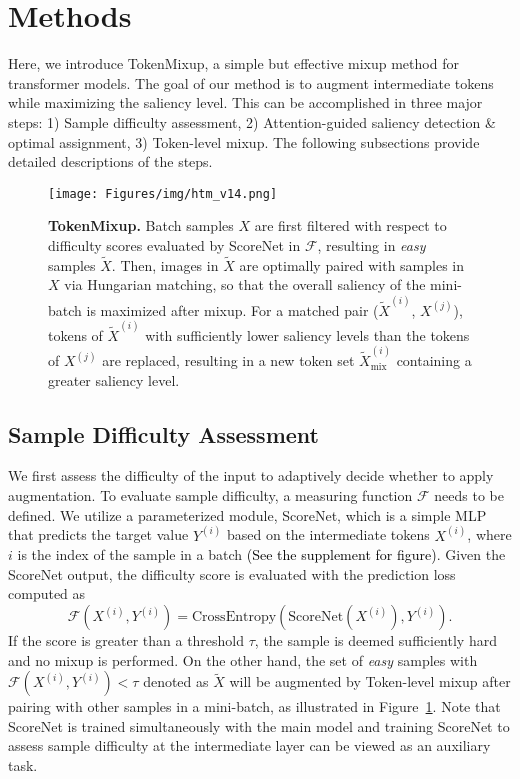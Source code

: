 \documentclass{article}
\begin{document}
 \section{Methods}
\label{section:method}
Here, we introduce TokenMixup, a simple but effective mixup method for transformer models.
The goal of our method is to augment intermediate tokens while maximizing the saliency level.
This can be accomplished in three major steps: 1) Sample difficulty assessment, 2) Attention-guided saliency detection \& optimal assignment, 3) Token-level mixup.
The following subsections provide detailed descriptions of the steps.


\begin{figure}[t]
\begin{center}
\texttt{[image: Figures/img/htm\_v14.png]}
\end{center}
\vspace{-4mm}
\caption{\footnotesize \textbf{TokenMixup.} Batch samples $X$ are first filtered with respect to difficulty scores evaluated by ScoreNet in $\mathcal{F}$, resulting in \textit{easy} samples $\tilde{X}$. 
Then, images in $\tilde{X}$ are optimally paired with samples in $X$ via Hungarian matching, so that the overall saliency of the mini-batch is maximized after mixup. 
For a matched pair ($\tilde{X}^{(i)}$, $X^{(j)}$), tokens of $\tilde{X}^{(i)}$ with sufficiently lower saliency levels than the tokens of $X^{(j)}$ are replaced, resulting in a new token set $\tilde{X}^{(i)}_{\textrm{mix}}$ containing a greater saliency level.}
\label{fig:htm}
\end{figure} 
\subsection{Sample Difficulty Assessment}
\label{sec:scorenet}
We first assess the difficulty of the input to adaptively decide whether to apply augmentation.
To evaluate sample difficulty, a measuring function $\mathcal{F}$ needs to be defined.
We utilize a parameterized module, ScoreNet, which is a simple MLP that predicts the target value $Y^{(i)}$ based on the intermediate tokens $X^{(i)}$, where $i$ is the index of the sample in a batch \textcolor{black}{(See the supplement for figure)}.
Given the ScoreNet output, the difficulty score is evaluated with the prediction loss computed as
\begin{equation}
\label{eq:difficulty}
    \mathcal{F}(X^{(i)}, Y^{(i)}) = \textrm{CrossEntropy}(\textrm{ScoreNet}(X^{(i)}), Y^{(i)}).
\end{equation}
If the score is greater than a threshold $\tau$, the sample is deemed sufficiently hard and no mixup is performed.
On the other hand, the set of \textit{easy} samples with $\mathcal{F}(X^{(i)}, Y^{(i)}) < \tau$ denoted as $\tilde{X}$ will be augmented by Token-level mixup after pairing with other samples in a mini-batch, as illustrated in Figure~\ref{fig:htm}.
Note that ScoreNet is trained simultaneously with the main model and training ScoreNet to assess sample difficulty at the intermediate layer can be viewed as an auxiliary task. 
\end{document}
